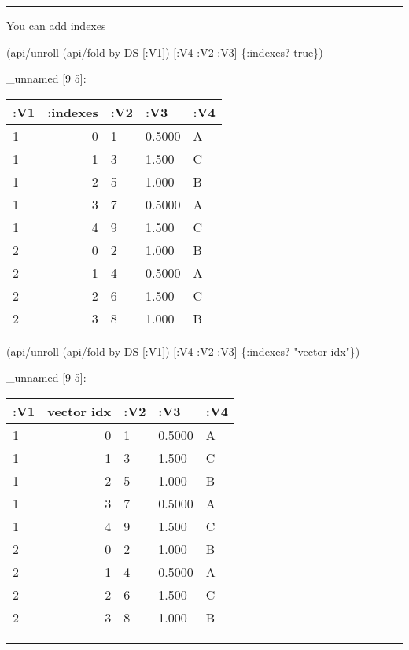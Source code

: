 \documentclass[]{article}
\newenvironment{Shaded}{\begin{snugshade}}{\end{snugshade}}
\newcommand{\StringTok}[1]{\textcolor[rgb]{0.31,0.60,0.02}{#1}}
\newcommand{\VariableTok}[1]{\textcolor[rgb]{0.00,0.00,0.00}{#1}}
\newcommand{\AttributeTok}[1]{\textcolor[rgb]{0.77,0.63,0.00}{#1}}
\newcommand{\NormalTok}[1]{#1}
\begin{document}
\begin{center}\rule{0.5\linewidth}{0.5pt}\end{center}

You can add indexes

\begin{Shaded}
\begin{Highlighting}[]
\NormalTok{(api/unroll (api/fold-by DS [}\AttributeTok{:V1}\NormalTok{]) [}\AttributeTok{:V4} \AttributeTok{:V2} \AttributeTok{:V3}\NormalTok{] \{}\AttributeTok{:indexes}\NormalTok{? }\VariableTok{true}\NormalTok{\})}
\end{Highlighting}
\end{Shaded}

\_unnamed {[}9 5{]}:

\begin{longtable}[]{@{}lrlll@{}}
\toprule
:V1 & :indexes & :V2 & :V3 & :V4\tabularnewline
\midrule
\endhead
1 & 0 & 1 & 0.5000 & A\tabularnewline
1 & 1 & 3 & 1.500 & C\tabularnewline
1 & 2 & 5 & 1.000 & B\tabularnewline
1 & 3 & 7 & 0.5000 & A\tabularnewline
1 & 4 & 9 & 1.500 & C\tabularnewline
2 & 0 & 2 & 1.000 & B\tabularnewline
2 & 1 & 4 & 0.5000 & A\tabularnewline
2 & 2 & 6 & 1.500 & C\tabularnewline
2 & 3 & 8 & 1.000 & B\tabularnewline
\bottomrule
\end{longtable}

\begin{Shaded}
\begin{Highlighting}[]
\NormalTok{(api/unroll (api/fold-by DS [}\AttributeTok{:V1}\NormalTok{]) [}\AttributeTok{:V4} \AttributeTok{:V2} \AttributeTok{:V3}\NormalTok{] \{}\AttributeTok{:indexes}\NormalTok{? }\StringTok{"vector idx"}\NormalTok{\})}
\end{Highlighting}
\end{Shaded}

\_unnamed {[}9 5{]}:

\begin{longtable}[]{@{}lrlll@{}}
\toprule
:V1 & vector idx & :V2 & :V3 & :V4\tabularnewline
\midrule
\endhead
1 & 0 & 1 & 0.5000 & A\tabularnewline
1 & 1 & 3 & 1.500 & C\tabularnewline
1 & 2 & 5 & 1.000 & B\tabularnewline
1 & 3 & 7 & 0.5000 & A\tabularnewline
1 & 4 & 9 & 1.500 & C\tabularnewline
2 & 0 & 2 & 1.000 & B\tabularnewline
2 & 1 & 4 & 0.5000 & A\tabularnewline
2 & 2 & 6 & 1.500 & C\tabularnewline
2 & 3 & 8 & 1.000 & B\tabularnewline
\bottomrule
\end{longtable}

\begin{center}\rule{0.5\linewidth}{0.5pt}\end{center}
\end{document}
